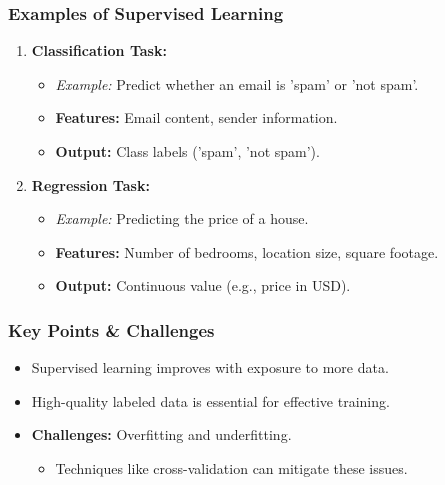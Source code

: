 \documentclass[aspectratio=169]{beamer}
\begin{document}
\begin{frame}[fragile]
    \frametitle{Examples of Supervised Learning}
    \begin{enumerate}
        \item \textbf{Classification Task:}
            \begin{itemize}
                \item \textit{Example:} Predict whether an email is 'spam' or 'not spam'.
                \item \textbf{Features:} Email content, sender information.
                \item \textbf{Output:} Class labels ('spam', 'not spam').
            \end{itemize}
        \item \textbf{Regression Task:}
            \begin{itemize}
                \item \textit{Example:} Predicting the price of a house.
                \item \textbf{Features:} Number of bedrooms, location size, square footage.
                \item \textbf{Output:} Continuous value (e.g., price in USD).
            \end{itemize}
    \end{enumerate}
\end{frame}

\begin{frame}[fragile]
    \frametitle{Key Points & Challenges}
    \begin{itemize}
        \item Supervised learning improves with exposure to more data.
        \item High-quality labeled data is essential for effective training.
        \item \textbf{Challenges:} Overfitting and underfitting.
            \begin{itemize}
                \item Techniques like cross-validation can mitigate these issues.
            \end{itemize}
    \end{itemize}
\end{frame}
\end{document}
